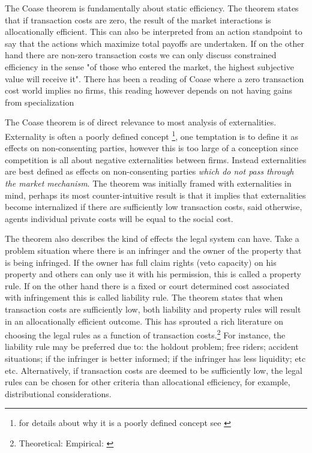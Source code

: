 \documentclass[12pt]{article}
\numberwithin{equation}{section}
\begin{document}
The Coase theorem is fundamentally about static efficiency. The theorem states that if transaction costs are zero, the result of the market interactions is allocationally efficient. This can also be interpreted from an action standpoint to say that the actions which maximize total payoffs are undertaken. If on the other hand there are non-zero transaction costs we can only discuss constrained efficiency in the sense "of those who entered the market, the highest subjective value will receive it". There has been a reading of Coase where a zero transaction cost world implies no firms, this reading however depends on not having gains from specialization \cite{demsetz2011rh}

The Coase theorem is of direct relevance to most analysis of externalities. Externality is often a poorly defined concept \footnote{for details about why it is a poorly defined concept see \cite{Cheung1970}}, one temptation is to define it as effects on non-consenting parties, however this is too large of a conception since competition is all about negative externalities between firms. Instead externalities are best defined as effects on non-consenting parties \textit{which do not pass through the market mechanism}. The theorem was initially framed with externalities in mind, perhaps its most counter-intuitive result is that it implies that externalities become internalized if there are sufficiently low transaction costs, said otherwise, agents individual private costs will be equal to the social cost.

The theorem also describes the kind of effects the legal system can have. Take a problem situation where there is an infringer and the owner of the property that is being infringed. If the owner has full claim rights (veto capacity) on his property and others can only use it with his permission, this is called a property rule. If on the other hand there is a fixed or court determined cost associated with infringement this is called liability rule. The theorem states that when transaction costs are sufficiently low, both liability and property rules will result in an allocationally efficient outcome. This has sprouted a rich literature on choosing the legal rules as a function of transaction costs.\footnote{Theoretical: \cite{calabresi1972property} Empirical: \cite{kaplow1995property}} For instance, the liability rule may be preferred due to: the holdout problem; free riders; accident situations; if the infringer is better informed; if the infringer has less liquidity; etc etc. Alternatively, if transaction costs are deemed to be sufficiently low, the legal rules can be chosen for other criteria than allocational efficiency, for example, distributional considerations.
\end{document}
